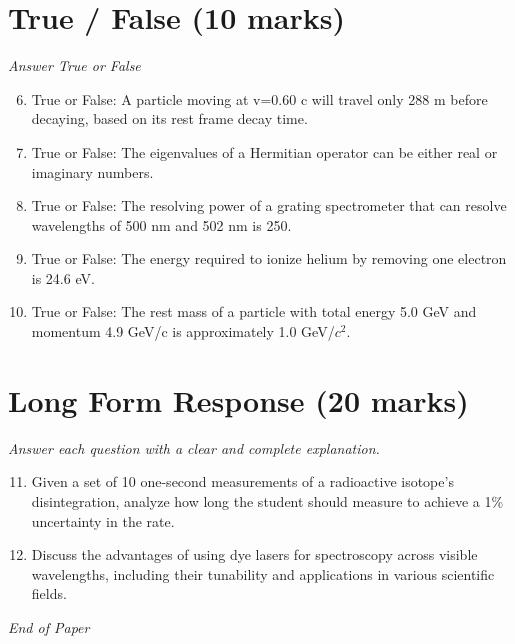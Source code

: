 \documentclass[12pt]{article}
\begin{document}
\section*{True / False (10 marks)}
\textit{Answer True or False}
\begin{enumerate}[label=\arabic*.]
\setcounter{enumi}{5}
\item True or False: A particle moving at v=0.60 c will travel only 288 m before decaying, based on its rest frame decay time.
\item True or False: The eigenvalues of a Hermitian operator can be either real or imaginary numbers.
\item True or False: The resolving power of a grating spectrometer that can resolve wavelengths of 500 nm and 502 nm is 250.
\item True or False: The energy required to ionize helium by removing one electron is 24.6 eV.
\item True or False: The rest mass of a particle with total energy 5.0 GeV and momentum 4.9 GeV/c is approximately 1.0 GeV/$c^2$.
\end{enumerate}

\section*{Long Form Response (20 marks)}
\textit{Answer each question with a clear and complete explanation.}
\begin{enumerate}[label=\arabic*.]
\setcounter{enumi}{10}
\item Given a set of 10 one-second measurements of a radioactive isotope's disintegration, analyze how long the student should measure to achieve a 1\% uncertainty in the rate.
\item Discuss the advantages of using dye lasers for spectroscopy across visible wavelengths, including their tunability and applications in various scientific fields.
\end{enumerate}

\vfill
\noindent\textit{End of Paper}
\end{document}
